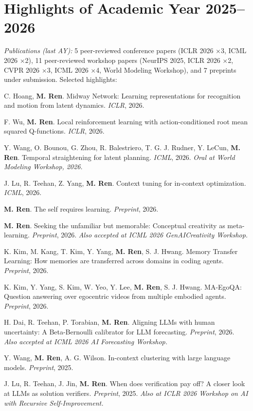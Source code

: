 \section{\sc Highlights of Academic Year 2025--2026}

{\it Publications (last AY):} 5 peer-reviewed conference papers (ICLR 2026 $\times$3, ICML 2026 $\times$2), 11 peer-reviewed workshop papers (NeurIPS 2025, ICLR 2026 $\times$2, CVPR 2026 $\times$3, ICML 2026 $\times$4, World Modeling Workshop), and 7 preprints under submission. Selected highlights:
\begin{list2}
\item C. Hoang, \textbf{M. Ren}. Midway Network: Learning representations for recognition and motion from latent dynamics. \textit{ICLR}, 2026.
\item F. Wu, \textbf{M. Ren}. Local reinforcement learning with action-conditioned root mean squared Q-functions. \textit{ICLR}, 2026.
\item Y. Wang, O. Bounou, G. Zhou, R. Balestriero, T. G. J. Rudner, Y. LeCun, \textbf{M. Ren}. Temporal straightening for latent planning. \textit{ICML}, 2026. \emph{Oral at World Modeling Workshop, 2026.}
\item J. Lu, R. Teehan, Z. Yang, \textbf{M. Ren}. Context tuning for in-context optimization. \textit{ICML}, 2026.
\item \textbf{M. Ren}. The self requires learning. \textit{Preprint}, 2026.
\item \textbf{M. Ren}. Seeking the unfamiliar but memorable: Conceptual creativity as meta-learning. \textit{Preprint}, 2026. \emph{Also accepted at ICML 2026 GenAICreativity Workshop.}
\item K. Kim, M. Kang, T. Kim, Y. Yang, \textbf{M. Ren}, S. J. Hwang. Memory Transfer Learning: How memories are transferred across domains in coding agents. \textit{Preprint}, 2026.
\item K. Kim, Y. Yang, S. Kim, W. Yeo, Y. Lee, \textbf{M. Ren}, S. J. Hwang. MA-EgoQA: Question answering over egocentric videos from multiple embodied agents. \textit{Preprint}, 2026.
\item H. Dai, R. Teehan, P. Torabian, \textbf{M. Ren}. Aligning LLMs with human uncertainty: A Beta-Bernoulli calibrator for LLM forecasting. \textit{Preprint}, 2026. \emph{Also accepted at ICML 2026 AI Forecasting Workshop.}
\item Y. Wang, \textbf{M. Ren}, A. G. Wilson. In-context clustering with large language models. \textit{Preprint}, 2025.
\item J. Lu, R. Teehan, J. Jin, \textbf{M. Ren}. When does verification pay off? A closer look at LLMs as solution verifiers. \textit{Preprint}, 2025. \emph{Also at ICLR 2026 Workshop on AI with Recursive Self-Improvement.}
\end{list2}

